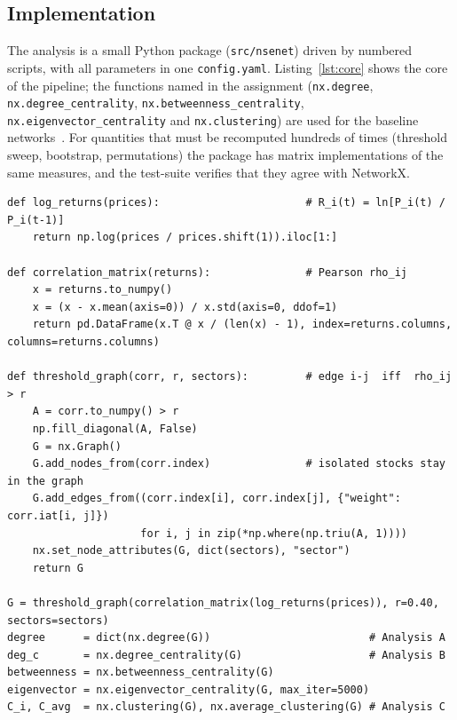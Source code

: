 \documentclass[11pt,a4paper]{article}
\begin{document}
\subsection{Implementation}

The analysis is a small Python package (\texttt{src/nsenet}) driven by numbered scripts, with all parameters in one
\texttt{config.yaml}. Listing~\ref{lst:core} shows the core of the pipeline; the functions named in the assignment
(\texttt{nx.degree}, \texttt{nx.degree\_centrality}, \texttt{nx.betweenness\_centrality},
\texttt{nx.eigen\-vector\_centrality} and \texttt{nx.clustering}) are used for the baseline networks~\cite{networkx}. For
quantities that must be recomputed hundreds of times (threshold sweep, bootstrap, permutations) the package has
matrix implementations of the same measures, and the test-suite verifies that they agree with NetworkX.

\begin{lstlisting}[float=tbp,caption={Core of the pipeline (condensed from \texttt{src/nsenet/}).},label=lst:core]
def log_returns(prices):                       # R_i(t) = ln[P_i(t) / P_i(t-1)]
    return np.log(prices / prices.shift(1)).iloc[1:]

def correlation_matrix(returns):               # Pearson rho_ij
    x = returns.to_numpy()
    x = (x - x.mean(axis=0)) / x.std(axis=0, ddof=1)
    return pd.DataFrame(x.T @ x / (len(x) - 1), index=returns.columns, columns=returns.columns)

def threshold_graph(corr, r, sectors):         # edge i-j  iff  rho_ij > r
    A = corr.to_numpy() > r
    np.fill_diagonal(A, False)
    G = nx.Graph()
    G.add_nodes_from(corr.index)               # isolated stocks stay in the graph
    G.add_edges_from((corr.index[i], corr.index[j], {"weight": corr.iat[i, j]})
                     for i, j in zip(*np.where(np.triu(A, 1))))
    nx.set_node_attributes(G, dict(sectors), "sector")
    return G

G = threshold_graph(correlation_matrix(log_returns(prices)), r=0.40, sectors=sectors)
degree      = dict(nx.degree(G))                         # Analysis A
deg_c       = nx.degree_centrality(G)                    # Analysis B
betweenness = nx.betweenness_centrality(G)
eigenvector = nx.eigenvector_centrality(G, max_iter=5000)
C_i, C_avg  = nx.clustering(G), nx.average_clustering(G) # Analysis C
\end{lstlisting}

\end{document}
